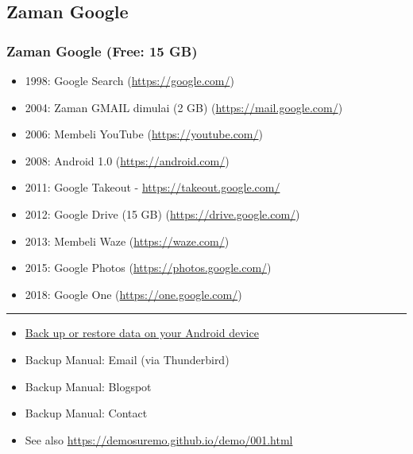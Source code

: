 \documentclass[xcolor=table, notheorems, hyperref={pdfpagelabels=false}]{beamer}
\begin{document}
\begin{frame}[fragile]
\section{Zaman Google}
\frametitle{Zaman Google (Free: 15 GB)}
\begin{itemize}
\item 1998: Google Search {\tiny (\url{https://google.com/})}
\item 2004: Zaman GMAIL dimulai (2 GB) {\tiny (\url{https://mail.google.com/})}
\item 2006: Membeli YouTube {\tiny (\url{https://youtube.com/})}
\item 2008: Android 1.0 {\tiny (\url{https://android.com/})}
\item 2011: Google Takeout - \url{https://takeout.google.com/}
\item 2012: Google Drive (15 GB) {\tiny (\url{https://drive.google.com/})}
\item 2013: Membeli Waze {\tiny (\url{https://waze.com/})}
\item 2015: Google Photos {\tiny (\url{https://photos.google.com/})}
\item 2018: Google One {\tiny (\url{https://one.google.com/})}
\end{itemize}

\noindent\rule{\textwidth}{1pt}

\begin{itemize}
\item \href{https://support.google.com/android/answer/2819582}{Back up or restore data on your Android device}
\item Backup Manual: Email (via Thunderbird)
\item Backup Manual: Blogspot
\item Backup Manual: Contact
\item See also \url{https://demosuremo.github.io/demo/001.html}
\end{itemize}
\end{frame}
\end{document}
